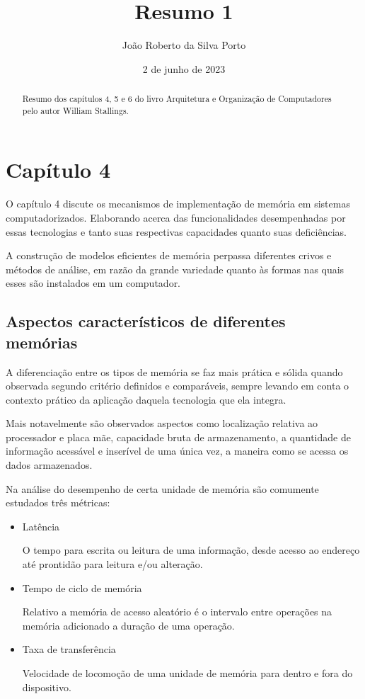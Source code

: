 \documentclass[12pt]{article}
\begin{document}
       
\title{Resumo 1}
\date{2 de junho de 2023}
\author{João Roberto da Silva Porto}

\begin{abstract}
Resumo dos capítulos 4, 5 e 6 do livro Arquitetura e Organização de Computadores pelo autor William Stallings.
\end{abstract}

\section{Capítulo 4}

O capítulo 4 discute os mecanismos de implementação de memória em sistemas computadorizados. Elaborando acerca das funcionalidades desempenhadas por essas tecnologias e tanto suas respectivas capacidades quanto suas deficiências.

A construção de modelos eficientes de memória perpassa diferentes crivos e métodos de análise, em razão da grande variedade quanto às formas nas quais esses são instalados em um computador.

\subsection{Aspectos característicos de diferentes memórias}
A diferenciação entre os tipos de memória se faz mais prática e sólida quando observada segundo critério definidos e comparáveis, sempre levando em conta o contexto prático da aplicação daquela tecnologia que ela integra.

Mais notavelmente são observados aspectos como localização relativa ao processador e placa mãe, capacidade bruta de armazenamento, a quantidade de informação acessável e inserível de uma única vez, a maneira como se acessa os dados armazenados.

Na análise do desempenho de certa unidade de memória são comumente estudados três métricas:
\begin{itemize}
    \item Latência

    O tempo para escrita ou leitura de uma informação, desde acesso ao endereço até prontidão para leitura e/ou alteração.

    \item Tempo de ciclo de memória

    Relativo a memória de acesso aleatório é o intervalo entre operações na memória adicionado a duração de uma operação.

    \item  Taxa de transferência

    Velocidade de locomoção de uma unidade de memória para dentro e fora do dispositivo.
\end{itemize}
\end{document}
